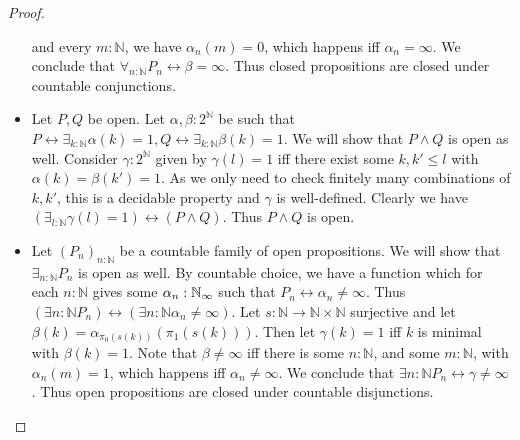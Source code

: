 \documentclass{../util/zariski-small}
\begin{document}
\begin{proof}
\begin{itemize}
      and every $m:\mathbb N$, we have $\alpha_n(m) = 0$, 
      which happens iff $\alpha_n = \infty$. 
      We conclude that $\forall_{n:\mathbb N} P_n \leftrightarrow \beta = \infty$.
      Thus closed propositions are closed under countable conjunctions. 
    \item 
      Let $P,Q$ be open. Let $\alpha,\beta:2^\mathbb N$ be such that 
      $
      P\leftrightarrow \exists_{k:\mathbb N}  \alpha(k) = 1, 
      Q\leftrightarrow \exists_{k:\mathbb N}  \beta(k) = 1
      $. 
      We will show that $P\wedge Q$ is open as well. 
      Consider $\gamma:2^\mathbb N$ given by 
      $\gamma(l) = 1$ iff there exist some $k,k'\leq l$ with 
      $\alpha(k) = \beta(k') = 1$. As we only need to check finitely many combinations 
      of $k,k'$, this is a decidable property and $\gamma$ is well-defined. 
      Clearly we have $(\exists_{l:\mathbb N} \gamma(l) = 1) \leftrightarrow (P \wedge Q)$. 
      Thus $P\wedge Q$ is open. 
    \item Let $(P_n)_{n:\mathbb N}$ be a countable family of open propositions. 
      We will show that $\exists_{n:\mathbb N}P_n$ is open as well. 
      By countable choice, we have a function which for each 
      $n:\mathbb N$ gives some $\alpha_n:\mathbb{N}_{\infty}$ 
      such that $P_n \leftrightarrow \alpha_n \neq \infty$. 
      Thus $(\exists{n:\mathbb N} P_n) \leftrightarrow 
      (\exists{n:\mathbb N}\alpha_n \neq \infty)$. 
      Let $s:\mathbb N \to \mathbb N \times \mathbb N$ surjective and let 
      $\beta(k) = \alpha_{\pi_0(s(k))}(\pi_1 (s(k)))$. 
      Then let $\gamma(k) = 1$ iff $k$ is minimal with $\beta(k) = 1$. 
      Note that $\beta \neq \infty$ iff there is some $n:\mathbb N$, 
      and some $m:\mathbb N$, with $\alpha_n(m) = 1$, 
      which happens iff $\alpha_n \neq \infty$. 
      We conclude that $\exists{n:\mathbb N} P_n \leftrightarrow \gamma \neq \infty$.
      Thus open propositions are closed under countable disjunctions. 
  \end{itemize}   
\end{proof}
\end{document}
